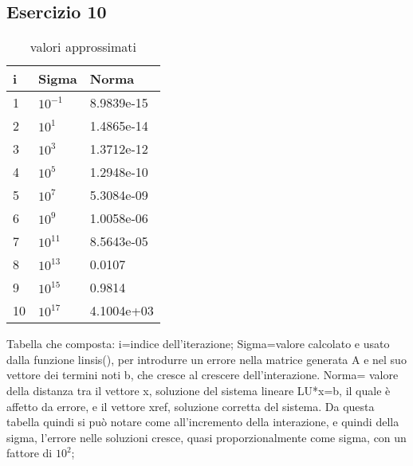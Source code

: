 \subsection{Esercizio 10}

\begin{table}[h]
\begin{tabular}{|l l l|}
        \hline
        i & Sigma  &  Norma\\
        \hline
        1 & $10^{-1}$  &  8.9839e-15\\
        2 & $10^{1}$ &  1.4865e-14 \\
        3 & $10^{3}$ &  1.3712e-12 \\
        4 & $10^{5}$ &  1.2948e-10 \\
        5 & $10^{7}$ &  5.3084e-09 \\
        6 & $10^{9}$ &  1.0058e-06 \\
        7 & $10^{11}$ &  8.5643e-05 \\
        8 & $10^{13}$ &  0.0107 \\
        9 & $10^{15}$ &  0.9814 \\
        10 & $10^{17}$ & 4.1004e+03\\
        \hline
\end{tabular}
Tabella che composta:
	i=indice dell'iterazione;
	Sigma=valore calcolato e usato dalla funzione linsis(), per introdurre un errore nella matrice generata A e nel suo vettore dei termini noti b, che cresce al crescere dell'interazione.
	Norma= valore della distanza tra il vettore x, soluzione del sistema lineare LU*x=b, il quale è affetto da errore, e il vettore xref, soluzione corretta del sistema.
Da questa tabella quindi si può notare come all'incremento della interazione, e quindi della sigma, l'errore nelle soluzioni  cresce, quasi proporzionalmente come sigma, con un fattore di $10^{2}$;
\caption{valori approssimati}
\label{tab::1}     
\end{table}
